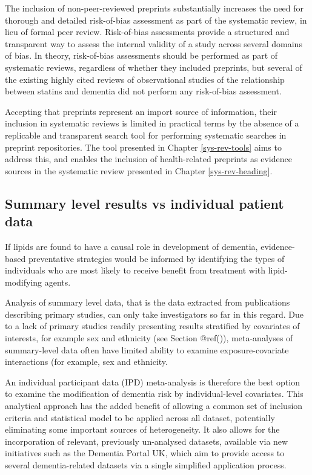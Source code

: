 \documentclass[a4paper, twoside]{templates/ociamthesis}
\begin{document}
The inclusion of non-peer-reviewed preprints substantially increases the need for thorough and detailed risk-of-bias assessment as part of the systematic review, in lieu of formal peer review. Risk-of-bias assessments provide a structured and transparent way to assess the internal validity of a study across several domains of bias. In theory, risk-of-bias assessments should be performed as part of systematic reviews, regardless of whether they included preprints, but several of the existing highly cited reviews of observational studies of the relationship between statins and dementia did not perform any risk-of-bias assessment.

Accepting that preprints represent an import source of information, their inclusion in systematic reviews is limited in practical terms by the absence of a replicable and transparent search tool for performing systematic searches in preprint repositories. The tool presented in Chapter \ref{sys-rev-tools} aims to address this, and enables the inclusion of health-related preprints as evidence sources in the systematic review presented in Chapter \ref{sys-rev-heading}.

\hypertarget{summary-level-results-vs-individual-patient-data}{%
\subsection{Summary level results vs individual patient data}\label{summary-level-results-vs-individual-patient-data}}

If lipids are found to have a causal role in development of dementia, evidence-based preventative strategies would be informed by identifying the types of individuals who are most likely to receive benefit from treatment with lipid-modifying agents.

Analysis of summary level data, that is the data extracted from publications describing primary studies, can only take investigators so far in this regard. Due to a lack of primary studies readily presenting results stratified by covariates of interests, for example sex and ethnicity (see Section @ref()), meta-analyses of summary-level data often have limited ability to examine exposure-covariate interactions (for example, sex and ethnicity.

An individual participant data (IPD) meta-analysis is therefore the best option to examine the modification of dementia risk by individual-level covariates. This analytical approach has the added benefit of allowing a common set of inclusion criteria and statistical model to be applied across all dataset, potentially eliminating some important sources of heterogeneity. It also allows for the incorporation of relevant, previously un-analysed datasets, available via new initiatives such as the Dementia Portal UK, which aim to provide access to several dementia-related datasets via a single simplified application process.
\end{document}
